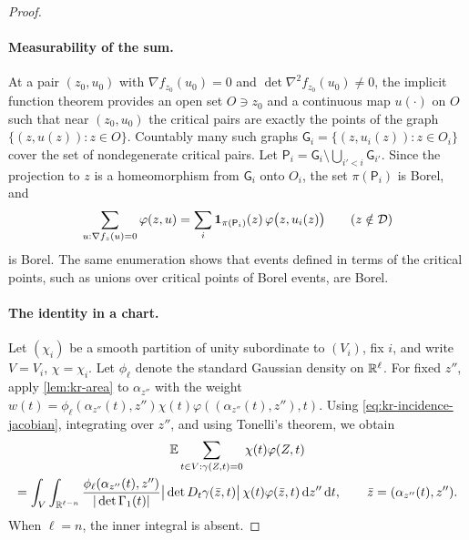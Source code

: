 \begin{proof}
\paragraph{Measurability of the sum.}
At a pair $(z_0,u_0)$ with $\nabla f_{z_0}(u_0)=0$ and $\det\nabla^2f_{z_0}(u_0)\ne0$, the implicit function theorem provides an open set $O\ni z_0$ and a continuous map $u(\cdot)$ on $O$ such that near $(z_0,u_0)$ the critical pairs are exactly the points of the graph $\{(z,u(z)):z\in O\}$. Countably many such graphs $\mathsf G_i=\{(z,u_i(z)):z\in O_i\}$ cover the set of nondegenerate critical pairs. Let $\mathsf P_i=\mathsf G_i\setminus\bigcup_{i'<i}\mathsf G_{i'}$. Since the projection to $z$ is a homeomorphism from $\mathsf G_i$ onto $O_i$, the set $\pi(\mathsf P_i)$ is Borel, and
\[
\sum_{u:\nabla f_z(u)=0}\varphi(z,u)=\sum_i\mathbf 1_{\pi(\mathsf P_i)}(z)\,\varphi\big(z,u_i(z)\big)\qquad(z\notin\mathcal D)
\]
is Borel. The same enumeration shows that events defined in terms of the critical points, such as unions over critical points of Borel events, are Borel.

\paragraph{The identity in a chart.}
Let $(\chi_i)$ be a smooth partition of unity subordinate to $(V_i)$, fix $i$, and write $V=V_i$, $\chi=\chi_i$. Let $\phi_\ell$ denote the standard Gaussian density on $\mathbb R^\ell$. For fixed $z''$, apply \cref{lem:kr-area} to $\alpha_{z''}$ with the weight $w(t)=\phi_\ell(\alpha_{z''}(t),z'')\chi(t)\varphi((\alpha_{z''}(t),z''),t)$. Using \eqref{eq:kr-incidence-jacobian}, integrating over $z''$, and using Tonelli's theorem, we obtain
\begin{multline}\label{eq:kr-local-incidence}
\mathbb E\sum_{t\in V:\gamma(Z,t)=0}\chi(t)\varphi(Z,t)\\
=\int_V\int_{\mathbb R^{\ell-n}}\frac{\phi_\ell(\alpha_{z''}(t),z'')}{|\det\Gamma_1(t)|}\big|\det D_t\gamma(\bar z,t)\big|\,\chi(t)\varphi(\bar z,t)\,\mathrm d z''\,\mathrm d t,\qquad \bar z=(\alpha_{z''}(t),z'').
\end{multline}
When $\ell=n$, the inner integral is absent.


\end{proof}
